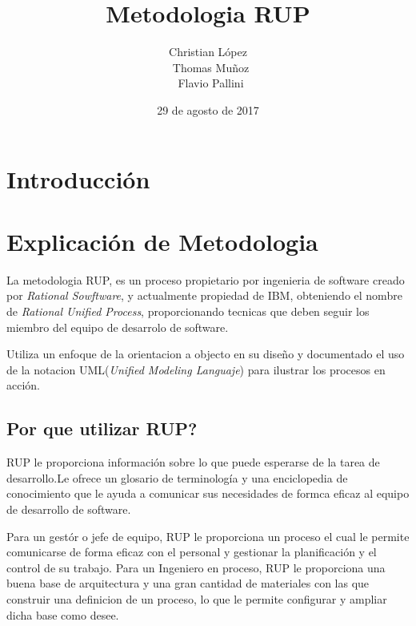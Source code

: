 \documentclass[spanish]{udpreport}
\title{Metodologia RUP}
\author{Christian López \\ Thomas Muñoz \\ Flavio Pallini}
\date{29 de agosto de 2017}
\begin{document}
\maketitle

\tableofcontents
\listoffigures

\chapter{Introducción}



\chapter{Explicación de Metodologia}

La metodologia RUP, es un proceso propietario por ingenieria de software creado por \textit{Rational Sowftware}, y actualmente propiedad de IBM, obteniendo el nombre de \textit{Rational Unified Process}, proporcionando tecnicas que deben seguir los miembro del equipo  de desarrolo de software. \par

Utiliza un enfoque de la orientacion a objecto en su diseño y documentado el uso de la notacion UML(\textit{Unified Modeling Languaje}) para ilustrar los procesos en acción. \par

\section{Por que utilizar RUP?}
\label{sec: Por que utilizar RUP}
RUP  le proporciona información sobre lo que puede esperarse de la tarea de desarrollo.Le ofrece un glosario de terminología y una enciclopedia de conocimiento que le ayuda a comunicar sus necesidades de formca eficaz al equipo de  desarrollo de software. \par
Para un gestór o jefe de equipo, RUP le proporciona  un proceso  el cual le permite comunicarse de forma eficaz con el personal y gestionar la planificación y el control de su trabajo. Para un Ingeniero en proceso, RUP le proporciona una buena base de arquitectura y una gran cantidad de materiales con las que construir una definicion de un proceso, lo que le permite configurar y ampliar dicha base como desee.
\end{document}
